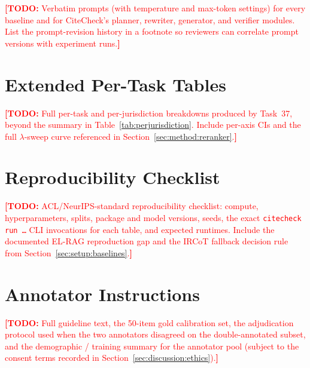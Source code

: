 \documentclass[11pt]{article}
\newcommand{\todo}[1]{\textcolor{red}{\textbf{[TODO:} #1\textbf{]}}}
\begin{document}
\todo{Verbatim prompts (with temperature and max-token settings) for
every baseline and for CiteCheck's planner, rewriter, generator, and
verifier modules. List the prompt-revision history in a footnote so
reviewers can correlate prompt versions with experiment runs.}

\section{Extended Per-Task Tables}
\label{app:tables}

\todo{Full per-task and per-jurisdiction breakdowns produced by
Task~37, beyond the summary in Table~\ref{tab:perjurisdiction}.
Include per-axis CIs and the full $\lambda$-sweep curve referenced in
Section~\ref{sec:method:reranker}.}

\section{Reproducibility Checklist}
\label{app:repro}

\todo{ACL/NeurIPS-standard reproducibility checklist: compute,
hyperparameters, splits, package and model versions, seeds, the exact
\texttt{citecheck run \ldots} CLI invocations for each table, and
expected runtimes. Include the documented EL-RAG reproduction gap
and the IRCoT fallback decision rule from
Section~\ref{sec:setup:baselines}.}

\section{Annotator Instructions}
\label{app:annotation}

\todo{Full guideline text, the 50-item gold calibration set, the
adjudication protocol used when the two annotators disagreed on the
double-annotated subset, and the demographic / training summary for
the annotator pool (subject to the consent terms recorded in
Section~\ref{sec:discussion:ethics}).}
\end{document}
